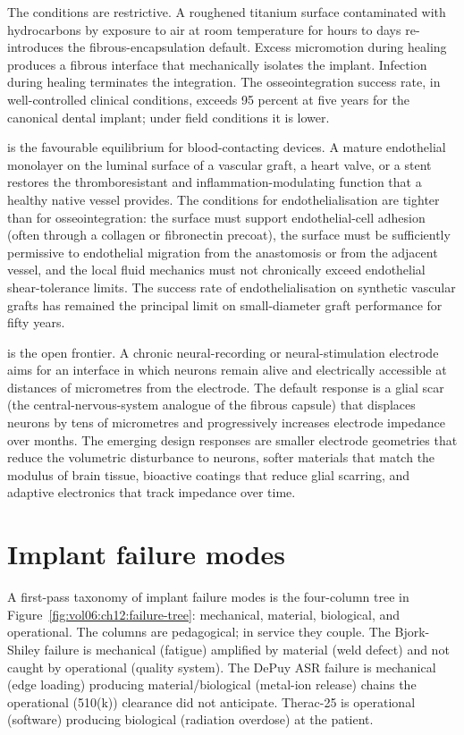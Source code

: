 The conditions are restrictive. A roughened titanium surface
contaminated with hydrocarbons by exposure to air at room
temperature for hours to days re-introduces the fibrous-encapsulation
default. Excess micromotion during healing produces a fibrous
interface that mechanically isolates the implant. Infection
during healing terminates the integration. The osseointegration
success rate, in well-controlled clinical conditions, exceeds 95
percent at five years for the canonical dental implant; under
field conditions it is lower.

 is the favourable equilibrium for
blood-contacting devices. A mature endothelial monolayer on the
luminal surface of a vascular graft, a heart valve, or a stent
restores the thromboresistant and inflammation-modulating function
that a healthy native vessel provides. The conditions for
endothelialisation are tighter than for osseointegration: the
surface must support endothelial-cell adhesion (often through a
collagen or fibronectin precoat), the surface must be sufficiently
permissive to endothelial migration from the anastomosis or from
the adjacent vessel, and the local fluid mechanics must not
chronically exceed endothelial shear-tolerance limits. The success
rate of endothelialisation on synthetic vascular grafts has
remained the principal limit on small-diameter graft performance
for fifty years.

 is the open frontier. A chronic
neural-recording or neural-stimulation electrode aims for an
interface in which neurons remain alive and electrically accessible
at distances of micrometres from the electrode. The default
response is a glial scar (the central-nervous-system analogue of
the fibrous capsule) that displaces neurons by tens of micrometres
and progressively increases electrode impedance over months. The
emerging design responses are smaller electrode geometries that
reduce the volumetric disturbance to neurons, softer materials
that match the modulus of brain tissue, bioactive coatings that
reduce glial scarring, and adaptive electronics that track
impedance over time.

\section{Implant failure modes}


A first-pass taxonomy of implant failure modes is the four-column
tree in Figure~\ref{fig:vol06:ch12:failure-tree}: mechanical,
material, biological, and operational. The columns are
pedagogical; in service they couple. The Bjork-Shiley failure is
mechanical (fatigue) amplified by material (weld defect) and not
caught by operational (quality system). The DePuy ASR failure is
mechanical (edge loading) producing material/biological
(metal-ion release) chains the operational (510(k)) clearance
did not anticipate. Therac-25 is operational (software) producing
biological (radiation overdose) at the patient.

